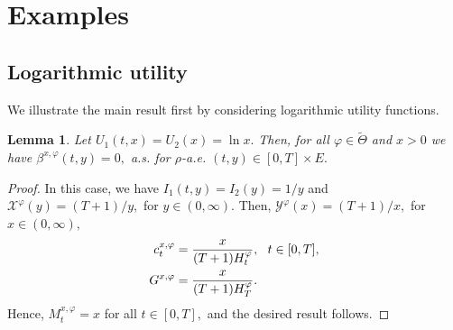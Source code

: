 \documentclass[11pt]{article}
\theoremstyle{plain}
\newtheorem{lemma}[theorem]{Lemma}
\theoremstyle{definition}
\numberwithin{equation}{section}
\newcommand{\Y}{\mathcal{Y}}
\newcommand{\calX}{\mathcal{X}}
\newcommand{\eps}{\varepsilon}
\newcommand{\B}{\mathcal{B}}
\begin{document}



\section{Examples}
\subsection{Logarithmic utility}
We illustrate the main result first by considering logarithmic utility functions.
\begin{lemma}\label{betalog}
Let $U_1(t,x)=U_2(x)=\ln x.$ Then, for all $\varphi\in\tilde{\Theta}$ and $x>0$ we have $\beta^{x,\varphi}(t,y)=0,$ a.s. for $\rho$-a.e. $(t,y)\in [0,T]\times E.$
\end{lemma}
\begin{proof}
In this case, we have $I_1(t,y)=I_2(y)=1/y$ and $\calX^\varphi(y)=(T+1)/y,$ for $y\in(0,\infty).$ Then, $\Y^\varphi(x)=(T+1)/x,$ for $x\in(0,\infty),$
\begin{align}
  c_t^{x,\varphi} &=\frac{x}{(T+1)H_t^\varphi}, \ \ t\in [0,T],\label{clog}\\
  G^{x,\varphi}&=\frac{x}{(T+1)H_T^\varphi}.\notag
\end{align}
Hence, $M_t^{x,\varphi}=x$ for all $t\in [0,T],$ and the desired result follows.
\end{proof}
\end{document}
